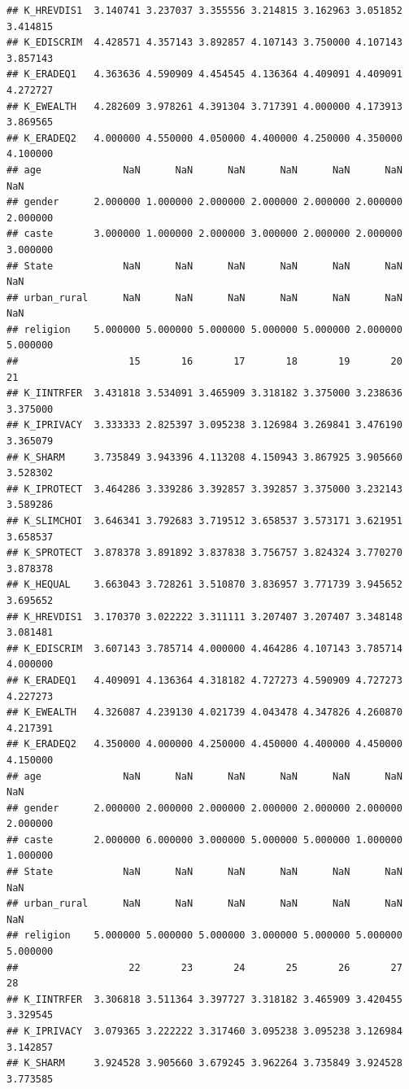 \documentclass[
]{article}
\begin{document}
\begin{verbatim}
## K_HREVDIS1  3.140741 3.237037 3.355556 3.214815 3.162963 3.051852 3.414815
## K_EDISCRIM  4.428571 4.357143 3.892857 4.107143 3.750000 4.107143 3.857143
## K_ERADEQ1   4.363636 4.590909 4.454545 4.136364 4.409091 4.409091 4.272727
## K_EWEALTH   4.282609 3.978261 4.391304 3.717391 4.000000 4.173913 3.869565
## K_ERADEQ2   4.000000 4.550000 4.050000 4.400000 4.250000 4.350000 4.100000
## age              NaN      NaN      NaN      NaN      NaN      NaN      NaN
## gender      2.000000 1.000000 2.000000 2.000000 2.000000 2.000000 2.000000
## caste       3.000000 1.000000 2.000000 3.000000 2.000000 2.000000 3.000000
## State            NaN      NaN      NaN      NaN      NaN      NaN      NaN
## urban_rural      NaN      NaN      NaN      NaN      NaN      NaN      NaN
## religion    5.000000 5.000000 5.000000 5.000000 5.000000 2.000000 5.000000
##                   15       16       17       18       19       20       21
## K_IINTRFER  3.431818 3.534091 3.465909 3.318182 3.375000 3.238636 3.375000
## K_IPRIVACY  3.333333 2.825397 3.095238 3.126984 3.269841 3.476190 3.365079
## K_SHARM     3.735849 3.943396 4.113208 4.150943 3.867925 3.905660 3.528302
## K_IPROTECT  3.464286 3.339286 3.392857 3.392857 3.375000 3.232143 3.589286
## K_SLIMCHOI  3.646341 3.792683 3.719512 3.658537 3.573171 3.621951 3.658537
## K_SPROTECT  3.878378 3.891892 3.837838 3.756757 3.824324 3.770270 3.878378
## K_HEQUAL    3.663043 3.728261 3.510870 3.836957 3.771739 3.945652 3.695652
## K_HREVDIS1  3.170370 3.022222 3.311111 3.207407 3.207407 3.348148 3.081481
## K_EDISCRIM  3.607143 3.785714 4.000000 4.464286 4.107143 3.785714 4.000000
## K_ERADEQ1   4.409091 4.136364 4.318182 4.727273 4.590909 4.727273 4.227273
## K_EWEALTH   4.326087 4.239130 4.021739 4.043478 4.347826 4.260870 4.217391
## K_ERADEQ2   4.350000 4.000000 4.250000 4.450000 4.400000 4.450000 4.150000
## age              NaN      NaN      NaN      NaN      NaN      NaN      NaN
## gender      2.000000 2.000000 2.000000 2.000000 2.000000 2.000000 2.000000
## caste       2.000000 6.000000 3.000000 5.000000 5.000000 1.000000 1.000000
## State            NaN      NaN      NaN      NaN      NaN      NaN      NaN
## urban_rural      NaN      NaN      NaN      NaN      NaN      NaN      NaN
## religion    5.000000 5.000000 5.000000 3.000000 5.000000 5.000000 5.000000
##                   22       23       24       25       26       27       28
## K_IINTRFER  3.306818 3.511364 3.397727 3.318182 3.465909 3.420455 3.329545
## K_IPRIVACY  3.079365 3.222222 3.317460 3.095238 3.095238 3.126984 3.142857
## K_SHARM     3.924528 3.905660 3.679245 3.962264 3.735849 3.924528 3.773585

\end{verbatim}
\end{document}
